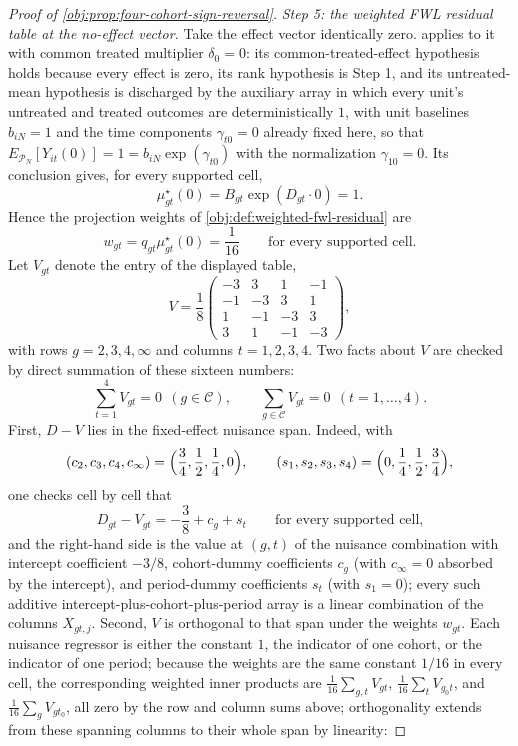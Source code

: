 \documentclass[11pt]{article}
\begin{document}
\begin{proof}[Proof of \cref{obj:prop:four-cohort-sign-reversal}]
\textit{Step 5: the weighted FWL residual table at the no-effect vector.} Take the effect vector identically zero.  applies to it with common treated multiplier \(\delta_0=0\): its common-treated-effect hypothesis holds because every effect is zero, its rank hypothesis is Step 1, and its untreated-mean hypothesis is discharged by the auxiliary array in which every unit's untreated and treated outcomes are deterministically \(1\), with unit baselines \(b_{iN}=1\) and the time components \(\gamma_{t0}=0\) already fixed here, so that \(E_{\mathcal P_N}[Y_{it}(0)]=1=b_{iN}\exp(\gamma_{t0})\) with the normalization \(\gamma_{10}=0\). Its conclusion gives, for every supported cell,
\[
\mu^\star_{gt}(0)=B_{gt}\exp(D_{gt}\cdot0)=1 .
\]
Hence the projection weights of \cref{obj:def:weighted-fwl-residual} are
\[
w_{gt}=q_{gt}\mu^\star_{gt}(0)=\frac{1}{16}
\qquad\text{for every supported cell.}
\]
Let \(V_{gt}\) denote the entry of the displayed table,
\[
V
=
\frac{1}{8}
\begin{pmatrix}
-3 & 3 & 1 & -1\\
-1 & -3 & 3 & 1\\
1 & -1 & -3 & 3\\
3 & 1 & -1 & -3
\end{pmatrix},
\]
with rows \(g=2,3,4,\infty\) and columns \(t=1,2,3,4\). Two facts about \(V\) are checked by direct summation of these sixteen numbers:
\[
\sum_{t=1}^4V_{gt}=0\ \ (g\in\mathcal C),
\qquad
\sum_{g\in\mathcal C}V_{gt}=0\ \ (t=1,\ldots,4).
\]
First, \(D-V\) lies in the fixed-effect nuisance span. Indeed, with
\[
(c_2,c_3,c_4,c_\infty)=\Bigl(\frac34,\frac12,\frac14,0\Bigr),
\qquad
(s_1,s_2,s_3,s_4)=\Bigl(0,\frac14,\frac12,\frac34\Bigr),
\]
one checks cell by cell that
\[
D_{gt}-V_{gt}=-\frac38+c_g+s_t
\qquad\text{for every supported cell,}
\]
and the right-hand side is the value at \((g,t)\) of the nuisance combination with intercept coefficient \(-3/8\), cohort-dummy coefficients \(c_g\) (with \(c_\infty=0\) absorbed by the intercept), and period-dummy coefficients \(s_t\) (with \(s_1=0\)); every such additive intercept-plus-cohort-plus-period array is a linear combination of the columns \(X_{gt,j}\).
Second, \(V\) is orthogonal to that span under the weights \(w_{gt}\). Each nuisance regressor is either the constant \(1\), the indicator of one cohort, or the indicator of one period; because the weights are the same constant \(1/16\) in every cell, the corresponding weighted inner products are \(\frac1{16}\sum_{g,t}V_{gt}\), \(\frac1{16}\sum_tV_{g_0t}\), and \(\frac1{16}\sum_gV_{gt_0}\), all zero by the row and column sums above; orthogonality extends from these spanning columns to their whole span by linearity:

\end{proof}
\end{document}
